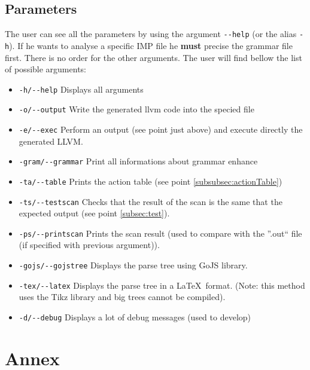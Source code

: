 \documentclass[a4paper,11pt]{article}
\begin{document}
  \subsection{Parameters}
    \label{subsec:parameters}
    The user can see all the parameters by using the argument \verb|--help| (or the alias \verb|-h|).  If he wants to analyse a specific IMP file he \textbf{must} precise the grammar file first. There is no order for the other arguments. The user will find bellow the list of possible arguments:
    \begin{itemize}
      \item \verb|-h/--help| Displays all arguments
      \item \verb|-o/--output| Write the generated llvm code into the specied file
      \item \verb|-e/--exec| Perform an output (see point just above) and execute directly the generated LLVM.
      \item \verb|-gram/--grammar| Print all informations about grammar enhance
      \item \verb|-ta/--table| Prints the action table (see point \ref{subsubsec:actionTable})
      \item \verb|-ts/--testscan| Checks that the result of the scan is the same that the expected output (see point \ref{subsec:test}).
      \item \verb|-ps/--printscan| Prints the scan result (used to compare with the ''.out`` file (if specified with previous argument)).
      \item \verb|-gojs/--gojstree| Displays the parse tree using GoJS library.
      \item \verb|-tex/--latex| Displays the parse tree in a \LaTeX\ format. (Note: this method uses the Tikz library and big trees cannot be compiled).
      \item \verb|-d/--debug| Displays a lot of debug messages (used to develop)
    \end{itemize}
    
\newpage
\appendix
{}

\section{Annex}
\end{document}
